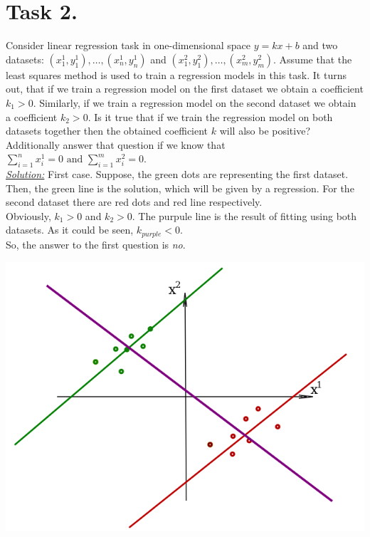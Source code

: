 \documentclass[a4paper,12pt]{article}
\begin{document}
\newpage
\section*{Task 2.}
Consider linear regression task in one-dimensional space \(y = kx+b\) and two
datasets: \((x_1^1 , y_1^1 ), \dots, (x^1_n , y_n^1 )\) and
\((x_1^2 , y_1^2), \dots, (x^2_m , y_m^2 )\).
Assume that the least squares method is used to train a regression models in this task.
It turns out, that if we train a regression model on the first dataset we obtain a coefficient \(k_1 > 0\).
Similarly, if we train a regression model on the second dataset we obtain a
coefficient \(k_2 > 0\). Is it true that if we train the regression model on
both datasets together then the obtained coefficient \(k\) will also
be positive?
Additionally answer that question if we know that \(\sum_{i=1}^nx_i^1 = 0 \text{ and  } \sum_{i=1}^mx_i^2 = 0\).\\
\newline
\underline{\textit{Solution:}} First case. Suppose, the green dots are
representing the first dataset. Then, the green line is the solution, which
will be given by a regression. For the second dataset there are red dots and
red line respectively.\\
\newline
Obviously, \(k_1 > 0\) and \(k_2 > 0\). The purpule line is the result of fitting using both datasets. As it could be seen, \(k_{purple} < 0\).\\
\newline
So, the answer to the first question is \textit{no}.
\begin{center}
\includegraphics[width=\textwidth]{fit-dataset}
\end{center}
\end{document}
